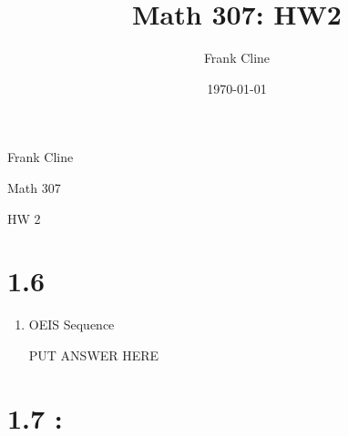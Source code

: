 \documentclass{article}
\title{Math 307: HW2}
\author{Frank Cline}
\date{\today}
\begin{document}
\onehalfspacing
\hfill Frank Cline

\hfill Math 307

\hfill HW 2

\section*{1.6} %

\begin{enumerate}
\setcounter{enumi}{0}
\item OEIS Sequence

PUT ANSWER HERE
\end{enumerate}

\section*{1.7 :} %
\end{document}
